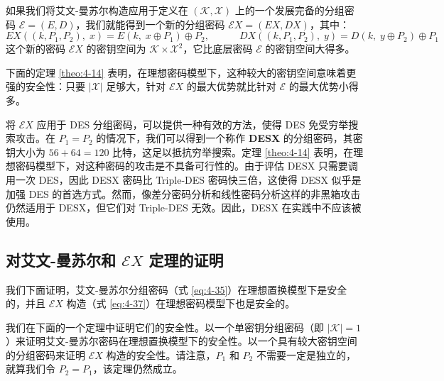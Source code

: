 \begin{snote}
如果我们将艾文-曼苏尔构造应用于定义在 $(\mathcal{K},\mathcal{X})$ 上的一个发展完备的分组密码 $\mathcal{E}=(E,D)$，我们就能得到一个新的分组密码 $\mathcal{E}X=(EX,DX)$，其中：
\begin{equation}\label{eq:4-37}
EX((k,P_1,P_2),\;x)=E(k,\;x\oplus P_1)\oplus P_2,
\quad\quad\quad
DX((k,P_1,P_2),\;y)=D(k,\;y\oplus P_2)\oplus P_1
\end{equation}
这个新的密码 $\mathcal{E}X$ 的密钥空间为 $\mathcal{K}\times\mathcal{X}^2$，它比底层密码 $\mathcal{E}$ 的密钥空间大得多。

下面的定理 \ref{theo:4-14} 表明，在理想密码模型下，这种较大的密钥空间意味着更强的安全性：只要 $|\mathcal{X}|$ 足够大，针对 $\mathcal{E}X$ 的最大优势就比针对 $\mathcal{E}$ 的最大优势小得多。

将 $\mathcal{E}X$ 应用于 DES 分组密码，可以提供一种有效的方法，使得 DES 免受穷举搜索攻击。在 $P_1=P_2$ 的情况下，我们可以得到一个称作 \textbf{DESX} 的分组密码，其密钥大小为 $56+64=120$ 比特，这足以抵抗穷举搜索。定理 \ref{theo:4-14} 表明，在理想密码模型下，对这种密码的攻击是不具备可行性的。由于评估 DESX 只需要调用一次 DES，因此 DESX 密码比 Triple-DES 密码快三倍，这使得 DESX 似乎是加强 DES 的首选方式。然而，像差分密码分析和线性密码分析这样的非黑箱攻击仍然适用于 DESX，但它们对 Triple-DES 无效。因此，DESX 在实践中不应该被使用。
\end{snote}

\subsection{对艾文-曼苏尔和 $\mathcal{E}X$ 定理的证明}\label{subsec:4-7-4}

我们下面证明，艾文-曼苏尔分组密码（式 \ref{eq:4-35}）在理想置换模型下是安全的，并且 $\mathcal{E}X$ 构造（式 \ref{eq:4-37}）在理想密码模型下也是安全的。

我们在下面的一个定理中证明它们的安全性。以一个单密钥分组密码（即 $|\mathcal{K}|=1$）来证明艾文-曼苏尔密码在理想置换模型下的安全性。以一个具有较大密钥空间的分组密码来证明 $\mathcal{E}X$ 构造的安全性。请注意，$P_1$ 和 $P_2$ 不需要一定是独立的，就算我们令 $P_2=P_1$，该定理仍然成立。

